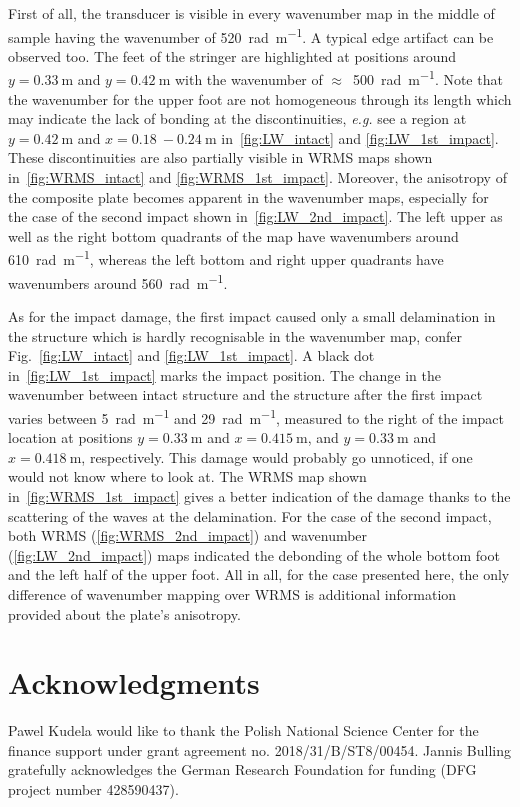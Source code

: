 \documentclass[times,final]{elsarticle}
\begin{document}
First of all, the transducer is visible in every wavenumber map in the middle of sample having the wavenumber of \SI{520}{\radian\per\meter}. A typical edge artifact can be observed too. The feet of the stringer are highlighted at positions around $y=\SI{0.33}{\meter}$ and $y=\SI{0.42}{\meter}$ with the wavenumber of $\approx$~\SI{500}{\radian\per\meter}. Note that the wavenumber for the upper foot are not homogeneous through its length which may indicate the lack of bonding at the discontinuities, \textit{e.g.} see a region at $y=\SI{0.42}{\meter}$ and $x=\SI{0.18}{}-\SI{0.24}{\meter}$ in~\autoref{fig:LW_intact} and \ref{fig:LW_1st_impact}. These discontinuities are also partially visible in WRMS maps shown in~\autoref{fig:WRMS_intact} and \ref{fig:WRMS_1st_impact}. Moreover, the anisotropy of the composite plate becomes apparent in the wavenumber maps, especially for the case of the second impact shown in~\autoref{fig:LW_2nd_impact}. The left upper as well as the right bottom quadrants of the map have wavenumbers around \SI{610}{\radian\per\meter}, whereas the left bottom and right upper quadrants have wavenumbers around \SI{560}{\radian\per\meter}.    

As for the impact damage, the first impact caused only a small delamination in the structure which is hardly recognisable in the wavenumber map, confer Fig.~\autoref{fig:LW_intact} and \ref{fig:LW_1st_impact}. A black dot in~\autoref{fig:LW_1st_impact} marks the impact position. The change in the wavenumber between intact structure and the structure after the first impact varies between \SI{5}{\radian\per\meter} and \SI{29}{\radian\per\meter}, measured to the right of the impact location at positions $y=\SI{0.33}{\meter}$ and $x=\SI{0.415}{\meter}$, and $y=\SI{0.33}{\meter}$ and $x=\SI{0.418}{\meter}$, respectively. This damage would probably go unnoticed, if one would not know where to look at. The WRMS map shown in~\autoref{fig:WRMS_1st_impact} gives a better indication of the damage thanks to the scattering of the waves at the delamination.
For the case of the second impact, both WRMS (\autoref{fig:WRMS_2nd_impact}) and wavenumber (\autoref{fig:LW_2nd_impact}) maps indicated the debonding of the whole bottom foot and the left half of the upper foot. All in all, for the case presented here, the only difference of wavenumber mapping over WRMS is additional information provided about the plate's anisotropy. 

\clearpage
\section*{Acknowledgments}
Pawel Kudela would like to thank the Polish National Science Center for the finance support under grant agreement no. 2018/31/B/ST8/00454. Jannis Bulling gratefully acknowledges the German Research Foundation for funding (DFG project number 428590437).
\end{document}
